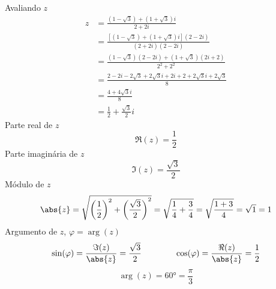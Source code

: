 \documentclass[a4paper,12pt,fleqn]{article}
\begin{document}
\begin{answer}
  Avaliando $z$
  \begin{align*}
    z
    & = \frac{ \left(1-\sqrt{3}\right) + \left(1+\sqrt{3}\right)i}{2+2i} \\[2mm]
    & = \frac{ \left[\left(1-\sqrt{3}\right) + \left(1+\sqrt{3}\right)i\right](2-2i)}{(2+2i)(2-2i)} \\[2mm]
    & = \frac{ \left(1-\sqrt{3}\right)(2-2i) + \left(1+\sqrt{3}\right)(2i+2)}{2^2 + 2^2} \\[2mm]
    & = \frac{ 2-2i-2\sqrt{3}+2\sqrt{3}i + 2i+2+2\sqrt{3}i +2\sqrt{3}}{8} \\[2mm]
    & = \frac{ 4 + 4\sqrt{3}i}{8} \\[2mm]
    & = \frac{1}{2} + \frac{\sqrt{3}}{2}i
  \end{align*}
  Parte real de $z$
  \[
    \Re(z) = \frac{1}{2}
  \]
  Parte imaginária de $z$
  \[
    \Im(z) = \frac{\sqrt{3}}{2}
  \]
  Módulo de $z$
  \[
    \abs{z}
    = \sqrt{\left(\frac{1}{2}\right)^2 + \left(\frac{\sqrt{3}}{2}\right)^2}
    = \sqrt{\frac{1}{4} + \frac{3}{4}}
    = \sqrt{\frac{1+3}{4}}
    = \sqrt{1}
    = 1
  \]
  Argumento de $z$, \(\varphi=\arg(z)\)
  \[
    \sin(\varphi)
    = \frac{\Im(z)}{\abs{z}}
    = \frac{\sqrt{3}}{2}
    \qquad\qquad
    \cos(\varphi)
    = \frac{\Re(z)}{\abs{z}}
    = \frac{1}{2}
  \]
  \[
    \arg(z)
    = \ang{60}
    = \frac{\pi}{3}
  \]
\end{answer}

\end{document}
